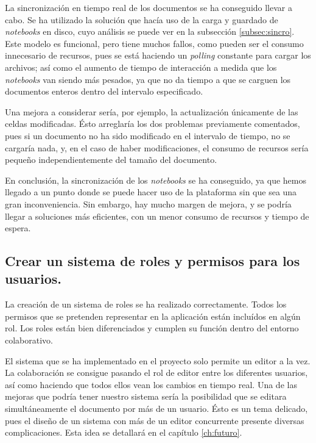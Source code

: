 \documentclass[11pt,spanish,listoffigures]{tfgetsinf}
\begin{document}
La sincronización en tiempo real de los documentos se ha conseguido llevar a cabo. Se ha utilizado la solución que hacía uso de la carga y guardado de \textit{notebooks} en disco, cuyo análisis se puede ver en la subsección \ref{subsec:sincro}. Este modelo es funcional, pero tiene muchos fallos, como pueden ser el consumo innecesario de recursos, pues se está haciendo un \textit{\gls{polling}} constante para cargar los archivos; así como el aumento de tiempo de interacción a medida que los \textit{notebooks} van siendo más pesados, ya que no da tiempo a que se carguen los documentos enteros dentro del intervalo especificado.

Una mejora a considerar sería, por ejemplo, la actualización únicamente de las celdas modificadas. Ésto arreglaría los dos problemas previamente comentados, pues si un documento no ha sido modificado en el intervalo de tiempo, no se cargaría nada, y, en el caso de haber modificaciones, el consumo de recursos sería pequeño independientemente del tamaño del documento. 

En conclusión, la sincronización de los \textit{notebooks} se ha conseguido, ya que hemos llegado a un punto donde se puede hacer uso de la plataforma sin que sea una gran inconveniencia. Sin embargo, hay mucho margen de mejora, y se podría llegar a soluciones más eficientes, con un menor consumo de recursos y tiempo de espera.

\subsection{Crear un sistema de roles y permisos para los usuarios.}
\label{subsec:objetivos-conc-roles}

La creación de un sistema de roles se ha realizado correctamente. Todos los permisos que se pretenden representar en la aplicación están incluídos en algún rol. Los roles están bien diferenciados y cumplen su función dentro del entorno colaborativo. 

El sistema que se ha implementado en el proyecto solo permite un editor a la vez. La colaboración se consigue pasando el rol de editor entre los diferentes usuarios, así como haciendo que todos ellos vean los cambios en tiempo real. Una de las mejoras que podría tener nuestro sistema sería la posibilidad que se editara simultáneamente el documento por más de un usuario. Ésto es un tema delicado, pues el diseño de un sistema con más de un editor concurrente presente diversas complicaciones. Esta idea se detallará en el capítulo \ref{ch:futuro}.
\end{document}
